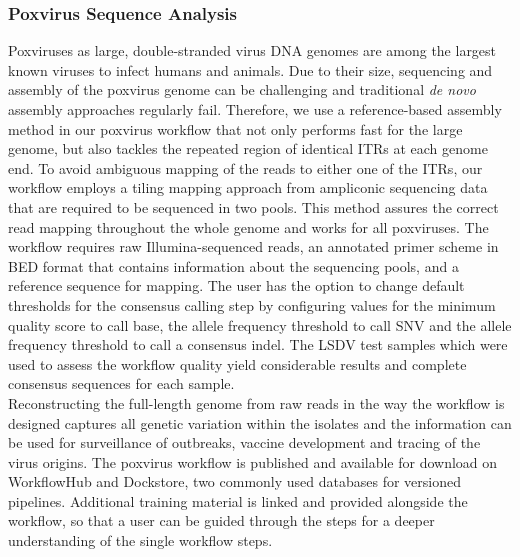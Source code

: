 \subsubsection*{Poxvirus Sequence Analysis}
Poxviruses as large, double-stranded virus \ac{DNA} genomes are among the largest known viruses to infect humans and animals. Due to their size, sequencing and assembly of the poxvirus genome can be challenging and traditional \textit{de novo} assembly approaches regularly fail. Therefore, we use a reference-based assembly method in our poxvirus workflow that not only performs fast for the large genome, but also tackles the repeated region of identical \acp{ITR} at each genome end. To avoid ambiguous mapping of the reads to either one of the \acp{ITR}, our workflow employs a tiling mapping approach from ampliconic sequencing data that are required to be sequenced in two pools. This method assures the correct read mapping throughout the whole genome and works for all poxviruses. The workflow requires raw Illumina-sequenced reads, an annotated primer scheme in \ac{BED} format that contains information about the sequencing pools, and a reference sequence for mapping. The user has the option to change default thresholds for the consensus calling step by configuring values for the minimum quality score to call base, the allele frequency threshold to call \ac{SNV} and the allele frequency threshold to call a consensus indel. The \ac{LSDV} test samples which were used to assess the workflow quality yield considerable results and complete consensus sequences for each sample. \\
Reconstructing the full-length genome from raw reads in the way the workflow is designed captures all genetic variation within the isolates and the information can be used for surveillance of outbreaks, vaccine development and tracing of the virus origins. The poxvirus workflow is published and available for download on WorkflowHub and Dockstore, two commonly used databases for versioned pipelines. Additional training material is linked and provided alongside the workflow, so that a user can be guided through the steps for a deeper understanding of the single workflow steps. 

